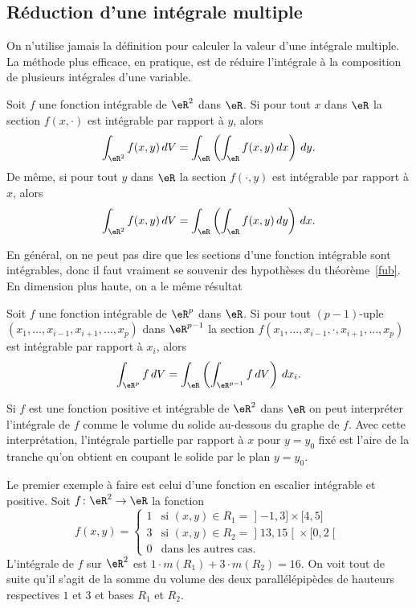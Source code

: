 \subsection{Réduction d'une intégrale multiple}
On n'utilise jamais la définition pour calculer la valeur d'une intégrale multiple. La méthode plus efficace, en pratique, est de réduire l'intégrale à la composition de plusieurs intégrales d'une variable.
\begin{theorem}[de Fubini]\label{fub}
	Soit \( f\) une fonction intégrable de \( \eR^2\) dans \( \eR\). Si pour tout \( x\) dans \( \eR\) la section \( f(x,\cdot)\) est intégrable par rapport à \( y\), alors
	\[
		\int_{\eR^2}f(x,y)\,dV=\int_{\eR}\left(\int_{\eR}f(x,y)\,dx\right)\,dy.
	\]
	De même, si pour tout \( y\) dans \( \eR\) la section \( f(\cdot, y)\) est intégrable par rapport à \( x\), alors
	\[
		\int_{\eR^2}f(x,y)\,dV=\int_{\eR}\left(\int_{\eR}f(x,y)\,dy\right)\,dx.
	\]
\end{theorem}		\label{ThoSectionINte}
En général, on ne peut pas dire que les sections d'une fonction intégrable sont intégrables, donc il faut vraiment se souvenir des hypothèses du théorème~\ref{fub}. En dimension plus haute, on a le même résultat
\begin{theorem}
	Soit \( f\) une fonction intégrable de \( \eR^p\) dans \( \eR\). Si pour tout \( (p-1)\)-uple \( (x_1,\ldots, x_{i-1},x_{i+1}, \ldots, x_p)\) dans \( \eR^{p-1}\) la section \( f(x_1,\ldots, x_{i-1},\cdot,x_{i+1}, \ldots, x_p)\) est intégrable par rapport à \( x_i\), alors
	\[
		\int_{\eR^p}f \,dV=\int_{\eR}\left(\int_{\eR^{p-1}}f \,dV\right)\,dx_i.
	\]
\end{theorem}

Si \( f\) est une fonction positive et intégrable de \( \eR^2\) dans \( \eR\) on peut interpréter l'intégrale de \( f\) comme le volume du solide au-dessous du graphe de \( f\).  Avec cette interprétation,  l'intégrale partielle par rapport à \( x\) pour \( y=y_0\) fixé est l'aire de la tranche qu'on obtient en coupant le solide par le plan \( y=y_0\).

\begin{example}
	Le premier exemple à faire est celui d'une fonction en escalier intégrable et positive. Soit \( f\colon \eR^2\to \eR\) la fonction
	\begin{equation}
		f(x,y)=\begin{cases}
			1 & \text{si }(x,y)\in R_1=\mathopen] -1 , 3 \mathclose]\times\mathopen[ 4 , 5 \mathclose]  \\
			3 & \text{si }(x,y)\in R_2=\mathopen] 13 , 15 \mathclose[\times\mathopen[ 0 , 2 \mathclose[ \\
			0 & \text{dans les autres cas.}
		\end{cases}
	\end{equation}
	L'intégrale de \( f\) sur \( \eR^2\) est \( 1\cdot m(R_1)+ 3\cdot m(R_2)= 16\). On voit tout de suite qu'il s'agit de la somme du volume des deux parallélépipèdes de hauteurs respectives \( 1\) et \( 3\) et bases \( R_1\) et \( R_2\).
\end{example}

